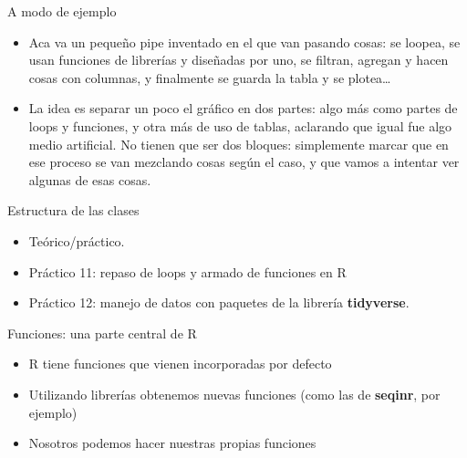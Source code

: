 \documentclass[ignorenonframetext,]{beamer}
\providecommand{\tightlist}{%
  \setlength{\itemsep}{0pt}\setlength{\parskip}{0pt}}
\begin{document}
\begin{frame}{A modo de ejemplo}
\protect\hypertarget{a-modo-de-ejemplo}{}

\begin{itemize}
\item
  Aca va un pequeño pipe inventado en el que van pasando cosas: se
  loopea, se usan funciones de librerías y diseñadas por uno, se
  filtran, agregan y hacen cosas con columnas, y finalmente se guarda la
  tabla y se plotea\ldots{}
\item
  La idea es separar un poco el gráfico en dos partes: algo más como
  partes de loops y funciones, y otra más de uso de tablas, aclarando
  que igual fue algo medio artificial. No tienen que ser dos bloques:
  simplemente marcar que en ese proceso se van mezclando cosas según el
  caso, y que vamos a intentar ver algunas de esas cosas.
\end{itemize}

\end{frame}

\begin{frame}{Estructura de las clases}
\protect\hypertarget{estructura-de-las-clases}{}

\begin{itemize}
\tightlist
\item
  Teórico/práctico.
\item
  Práctico 11: repaso de loops y armado de funciones en R
\item
  Práctico 12: manejo de datos con paquetes de la librería
  \textbf{tidyverse}.
\end{itemize}

\end{frame}

\begin{frame}{Funciones: una parte central de R}
\protect\hypertarget{funciones-una-parte-central-de-r}{}

\begin{itemize}
\tightlist
\item
  R tiene funciones que vienen incorporadas por defecto
\item
  Utilizando librerías obtenemos nuevas funciones (como las de
  \textbf{seqinr}, por ejemplo)
\item
  Nosotros podemos hacer nuestras propias funciones
\end{itemize}

\end{frame}
\end{document}
